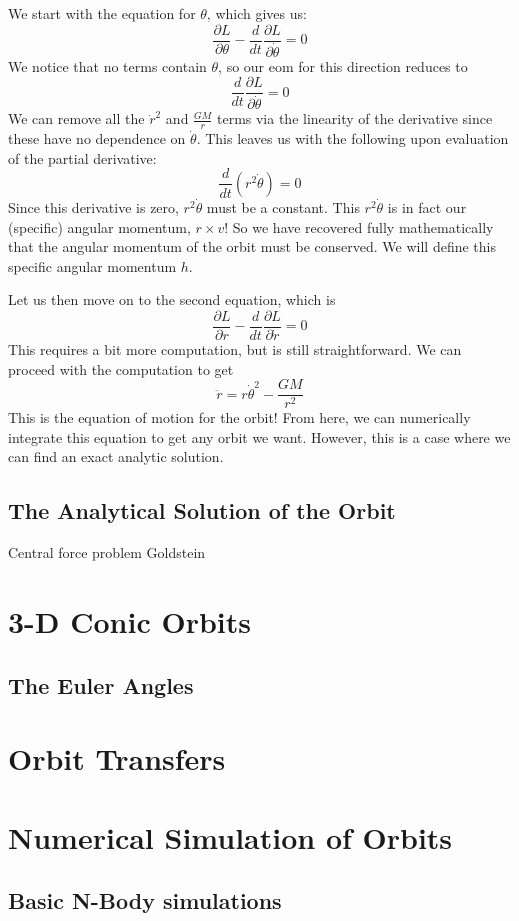 We start with the equation for $\theta$, which gives us:
$$\frac{\partial L}{\partial \theta}-\frac{d}{dt}\frac{\partial L}{\partial \dot{\theta}}=0$$
We notice that no terms contain $\theta$, so our \gls{eom} for this direction reduces to
$$\frac{d}{dt}\frac{\partial L}{\partial \dot{\theta}}=0$$
We can remove all the $\dot{r}^2$ and $\frac{GM}{r}$ terms via the linearity of the derivative since these have no dependence on $\dot{\theta}$. This leaves us with the following upon evaluation of the partial derivative:
$$\frac{d}{dt}\left(r^2\dot{\theta}\right)=0$$
Since this derivative is zero, $r^2\dot{\theta}$ must be a constant. This $r^2\dot{\theta}$ is in fact our (specific) angular momentum, $r\times v$! So we have recovered fully mathematically that the angular momentum of the orbit must be conserved. We will define this specific angular momentum $h$.

Let us then move on to the second equation, which is 
$$\frac{\partial L}{\partial r}-\frac{d}{dt}\frac{\partial L}{\partial \dot{r}}=0$$
This requires a bit more computation, but is still straightforward. We can proceed with the computation to get
$$\ddot{r}=r\dot{\theta}^2-\frac{GM}{r^2}$$
This is the equation of motion for the orbit! From here, we can numerically integrate this equation to get any orbit we want. However, this is a case where we can find an exact analytic solution.

\subsection{The Analytical Solution of the Orbit}
Central force problem Goldstein

\section{3-D Conic Orbits}
\subsection{The Euler Angles}

\section{Orbit Transfers}

\section{Numerical Simulation of Orbits}
\subsection{Basic N-Body simulations}
